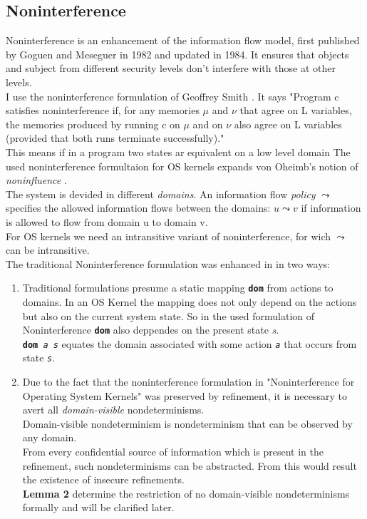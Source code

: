 \documentclass[pdftex,11pt,a4paper,twoside]{article}
\begin{document}
	\subsection{Noninterference}
	Noninterference is an enhancement of the information flow model, first published by Goguen and Meseguer in 1982 and updated in 1984. It ensures that objects and subject from different security levels don't interfere with those at other levels. \\
	I use the noninterference formulation of Geoffrey Smith \cite{InfFlow}. It says "Program c satisfies noninterference if, for
any memories $\mu$ and $\nu$ that agree on L variables, the memories produced by
running c on $\mu$ and on $\nu$ also agree on L variables (provided that both runs
terminate successfully)." \\
This means if in a program two states ar equivalent on a low level domain 
	The used noninterference formultaion for OS kernels \cite{NonOp} expands von Oheimb's notion of \textit{noninfluence} \cite{Noninf}. \\
	The system is devided in different \textit{domains}. An information flow \textit{policy} $\leadsto$ specifies the allowed information flows between the domains: $u \leadsto v$ if information is allowed to flow from domain u to domain v. \\
	For OS kernels we need an intransitive variant of noninterference, for wich $\leadsto$ can be intransitive. \\
	The traditional Noninterference formulation was enhanced in in two ways: 
	\begin{enumerate}
	\item Traditional formulations presume a static mapping \textbf{\texttt{dom}} from actions to domains. In an OS Kernel the mapping does not only depend on the actions but also on the current system state. So in the used formulation of Noninterference \cite{NonOp} \textbf{\texttt{dom}} also deppendes on the present state \textit{s}. \\
	\texttt{\textbf{dom}\textit{ a s}} equates the domain associated with some action \textit{\texttt{a}} that occurs from state \texttt{\textit{s}}.
	\item Due to the fact that the noninterference formulation in "Noninterference for Operating System Kernels" \cite{NonOp} was preserved by refinement, it is necessary to avert all \textit{domain-visible} nondeterminisms. \\
	Domain-visible nondeterminism is nondeterminism that can be observed by any domain. \\
	From every confidential source of information which is present in the refinement, such nondeterminisms can be abstracted. From this would result the existence of insecure refinements. \\
	\textbf{Lemma 2} \cite{NonOp} determine the restriction of no domain-visible nondeterminisms formally and will be clarified later. 
	\end{enumerate}
	
\end{document}
